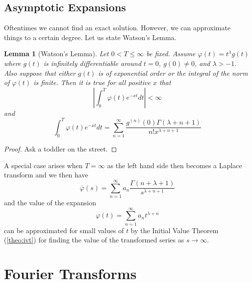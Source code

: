 \documentclass{report}
\newtheorem{lemma}[theorem]{Lemma}
\theoremstyle{definition}
\theoremstyle{remark}
\begin{document}
\section{Asymptotic Expansions}
Oftentimes we cannot find an exact solution. However, we can approximate things to a certain degree. Let us state Watson's Lemma.
\begin{lemma}[Watson's Lemma]
    Let $0<T\leq \infty$ be fixed. Assume $\varphi(t)=t^{\lambda}g(t) $ where $g(t)$ is infinitely differentiable around $t=0$, $g(0)\neq 0$, and $\lambda > -1$. Also suppose that either $g(t)$ is of exponential order or the integral of the norm of $\varphi(t)$ is finite. Then it is true for all positive $x$ that 
    \begin{equation*}
        \left| \int^T_0\varphi(t)e^{-xt}dt \right| < \infty
    \end{equation*} 
    and 
    \begin{equation*}
        \int^T_0\varphi(t) e^{-xt}dt = \sum^\infty_{n=1}\frac{g^{(n)}(0)\Gamma(\lambda+n+1)}{n! x^{\lambda+n+1}}
    \end{equation*}
\end{lemma}
\begin{proof}
    Ask a toddler on the street.
\end{proof}

A special case arises when $T=\infty$ as the left hand side then becomes a Laplace transform and we then have 
\begin{equation*}
    \bar \varphi (s) = \sum^\infty_{n=1}a_n\frac{\Gamma(n+\lambda+1)}{s^{\lambda+n+1}}
\end{equation*}
and the value of the expansion 
\begin{equation*}
    \varphi(t) = \sum^\infty_{n=1}a_nt^{\lambda+n}
\end{equation*}
can be approximated for small values of $t$ by the Initial Value Theorem (\ref{theo:ivt}) for finding the value of the transformed series as $s\rightarrow \infty$.







\chapter{Fourier Transforms}
\end{document}
